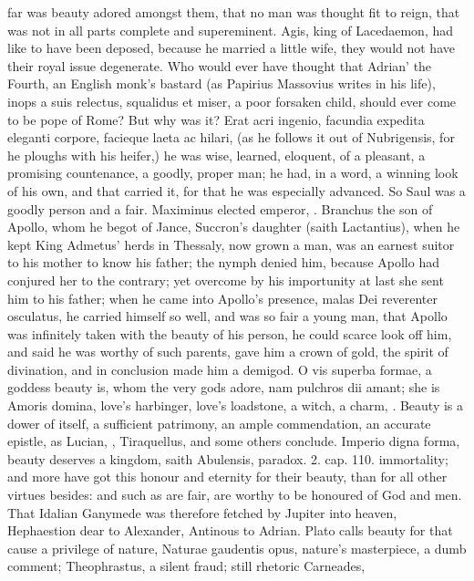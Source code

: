 far was beauty adored amongst them, that no man was thought fit to
reign, that was not in all parts complete and supereminent. Agis, king
of Lacedaemon, had like to have been deposed, because he married a
little wife, they would not have their royal issue degenerate. Who
would ever have thought that Adrian' the Fourth, an English monk's
bastard (as Papirius Massovius writes in his life), inops a suis
relectus, squalidus et miser, a poor forsaken child, should ever come
to be pope of Rome? But why was it? Erat acri ingenio, facundia
expedita eleganti corpore, facieque laeta ac hilari, (as he follows it
out of Nubrigensis, for he ploughs with his heifer,) he was wise,
learned, eloquent, of a pleasant, a promising countenance, a goodly,
proper man; he had, in a word, a winning look of his own, and that
carried it, for that he was especially advanced. So Saul was a goodly
person and a fair. Maximinus elected emperor, \etc{}. Branchus the son of
Apollo, whom he begot of Jance, Succron's daughter (saith Lactantius),
when he kept King Admetus' herds in Thessaly, now grown a man, was an
earnest suitor to his mother to know his father; the nymph denied him,
because Apollo had conjured her to the contrary; yet overcome by his
importunity at last she sent him to his father; when he came into
Apollo's presence, malas Dei reverenter osculatus, he carried himself
so well, and was so fair a young man, that Apollo was infinitely taken
with the beauty of his person, he could scarce look off him, and said
he was worthy of such parents, gave him a crown of gold, the spirit of
divination, and in conclusion made him a demigod. O vis superba formae,
a goddess beauty is, whom the very gods adore, nam pulchros dii amant;
she is Amoris domina, love's harbinger, love's loadstone, a witch, a
charm, \etc{}. Beauty is a dower of itself, a sufficient patrimony, an
ample commendation, an accurate epistle, as Lucian,
\Apuleius, Tiraquellus, and some others conclude. Imperio digna
forma, beauty deserves a kingdom, saith Abulensis, paradox. 2. cap.
110. immortality; and more have got this honour and eternity for
their beauty, than for all other virtues besides: and such as are fair,
are worthy to be honoured of God and men. That Idalian Ganymede was
therefore fetched by Jupiter into heaven, Hephaestion dear to
Alexander, Antinous to Adrian. Plato calls beauty for that cause a
privilege of nature, Naturae gaudentis opus, nature's masterpiece, a
dumb comment; Theophrastus, a silent fraud; still rhetoric Carneades,

